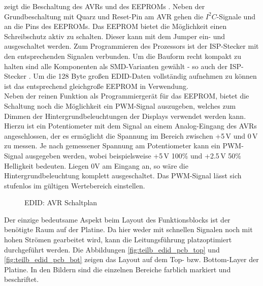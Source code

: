  zeigt die Beschaltung des AVRs  und des EEPROMs . Neben der Grundbeschaltung mit Quarz und Reset-Pin am AVR gehen die $I^2C$-Signale  und  an die Pins des EEPROMs. Das EEPROM bietet die Möglichkeit einen Schreibschutz aktiv zu schalten. 
Dieser kann mit dem Jumper  ein- und ausgeschaltet werden. Zum Programmieren des Prozessors ist der ISP-Stecker mit den entsprechenden Signalen verbunden. Um die Bauform recht kompakt zu halten sind alle Komponenten als SMD-Varianten gewählt - so auch der ISP-Stecker . 
Um die 128 Byte großen EDID-Daten vollständig aufnehmen zu können ist das entsprechend gleichgroße EEPROM  in Verwendung. \\
Neben der reinen Funktion als Programmiergerät für das EEPROM, bietet die Schaltung noch die Möglichkeit ein PWM-Signal auszugeben, welches zum Dimmen der Hintergrundbeleuchtungen der Displays verwendet werden kann. 
Hierzu ist ein Potentiometer mit dem Signal  an einem Analog-Eingang des AVRs angeschlossen, der es ermöglicht die Spannung im Bereich zwischen +5\,V und 0\,V zu messen. 
Je nach gemessener Spannung am Potentiometer kann ein PWM-Signal  ausgegeben werden, wobei beispielsweise +5\,V 100\%  und +2.5\,V 50\% Helligkeit bedeuten. 
Liegen 0V am Eingang an, so wäre die Hintergrundbeleuchtung komplett ausgeschaltet. Das PWM-Signal lässt sich stufenlos im gültigen Wertebereich einstellen. 
\begin{figure}[htbp]
	\center
    \caption{EDID: AVR Schaltplan}
    \label{fig:teilb_edid_avr_sch}
\end{figure}
Der einzige bedeutsame Aspekt beim Layout des Funktionsblocks ist der benötigte Raum auf der Platine. 
Da hier weder mit schnellen Signalen noch mit hohen Strömen gearbeitet wird, kann die Leitungsführung platzoptimiert durchgeführt werden. 
Die Abbildungen \ref{fig:teilb_edid_pcb_top} und \ref{fig:teilb_edid_pcb_bot} zeigen das Layout auf dem Top- bzw. Bottom-Layer der Platine. 
In den Bildern sind die einzelnen Bereiche farblich markiert und beschriftet.

